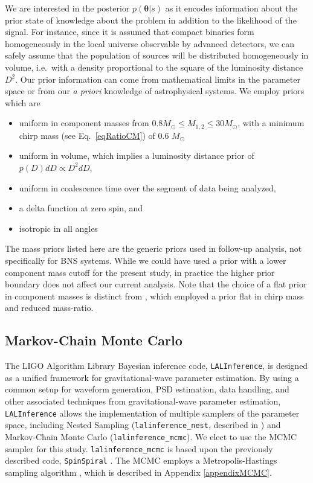\documentclass[11pt,a4paper]{emulateapj} 
\newcommand{\carl}[1]{{\color{red} #1}}
\newcommand{\thpara}{\boldsymbol{\theta}}
\begin{document}
We are interested in the posterior $p(\thpara | s)$ as it encodes
information about the prior state of knowledge about the problem in
addition to the likelihood of the signal.  For instance, since it is
assumed that compact binaries form homogeneously in the local universe
observable by advanced detectors, we can safely assume that the
population of sources will be distributed homogeneously in volume, i.e.\
with a density proportional to the square of the luminosity distance $D^2$.  
Our prior information can come from mathematical limits in the parameter space 
or from our \textit{a priori} knowledge of astrophysical systems.  
We employ priors which are
\begin{itemize}
\item uniform in component masses from $0.8M_{\odot} \leq M_{1,2} \leq
  30M_{\odot}$, with a minimum chirp mass (see Eq.~\eqref{eqRatioCM})
  of 0.6 $M_{\odot}$ 
\item uniform in volume, which implies a luminosity distance prior of
  $p(D)dD \propto D^2 dD$,
\item uniform in coalescence time over the segment of data being
  analyzed,
  \item a delta function at zero spin, and
\item isotropic in all angles
\end{itemize}
The mass priors listed here are the generic priors used in follow-up
analysis, not specifically for BNS systems.  While we could have used
a prior with a lower component mass cutoff for the present study, in
practice the higher prior boundary does not affect our current
analysis.  \carl{Note that the choice of a flat prior in component masses is distinct from \cite{Nissanke2013},
 which employed a prior flat in chirp mass and reduced mass-ratio.}


  
\subsection{Markov-Chain Monte Carlo}
\label{MCMCSection}
  
The LIGO Algorithm Library Bayesian inference code,
\texttt{LALInference}, is designed as a unified framework for
gravitational-wave parameter estimation.  By using a common setup for
waveform generation, PSD estimation, data handling, and other
associated techniques from gravitational-wave parameter estimation,
\texttt{LALInference} allows the implementation of multiple samplers
of the parameter space, including Nested Sampling
(\texttt{lalinference\_nest}, described in \cite{nestedsampling2010})
and Markov-Chain Monte Carlo (\texttt{lalinference\_mcmc}).  We elect
to use the MCMC sampler for this study.  \texttt{lalinference\_mcmc}
is based upon the previously described code, \texttt{SpinSpiral}
\citep{spinspiral2009, spinspiral2010}.  The MCMC employs a
Metropolis-Hastings sampling algorithm \citep{Gilks99}, which is described in 
Appendix \ref{appendixMCMC}.
\end{document}
